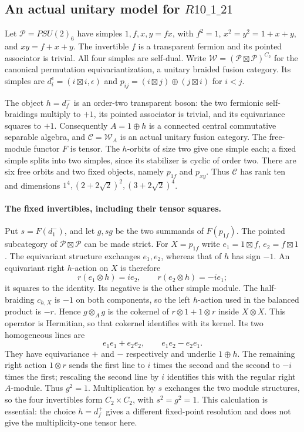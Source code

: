 \subsection[An actual unitary model for R10-1-21]{An actual unitary model for $R10\_1\_21$}
Let $\mathcal P=PSU(2)_6$ have simples $1,f,x,y=fx$, with
$f^2=1$, $x^2=y^2=1+x+y$, and $xy=f+x+y$.
The invertible $f$ is a transparent fermion and its pointed associator is
trivial. All four simples are self-dual. Write
$\mathcal W=(\mathcal P\boxtimes\mathcal P)^{C_2}$ for the canonical
permutation equivariantization, a unitary braided fusion category.
Its simples are $d_i^\epsilon=(i\boxtimes i,\epsilon)$ and
$p_{ij}=(i\boxtimes j)\oplus(j\boxtimes i)$ for $i<j$.

The object $h=d_f^-$ is an order-two transparent boson: the two fermionic
self-braidings multiply to $+1$, its pointed associator is trivial, and
its equivariance squares to $+1$. Consequently $A=1\oplus h$ is a
connected central commutative separable algebra, and $\mathcal C=\mathcal W_A$
is an actual unitary fusion category. The free-module functor $F$ is tensor.
The $h$-orbits of size two give one simple each; a fixed simple splits
into two simples, since its stabilizer is cyclic of order two. There are
six free orbits and two fixed objects, namely $p_{1f}$ and $p_{xy}$.
Thus $\mathcal C$ has rank ten and dimensions
$1^4,(2+2\sqrt2)^2,(3+2\sqrt2)^4$.

\paragraph{The fixed invertibles, including their tensor squares.}
Put $s=F(d_1^-)$, and let $g,sg$ be the two summands of $F(p_{1f})$.
The pointed subcategory of $\mathcal P\boxtimes\mathcal P$ can be made
strict. For $X=p_{1f}$ write $e_1=1\boxtimes f$, $e_2=f\boxtimes1$.
The equivariant structure exchanges $e_1,e_2$, whereas that of $h$ has
sign $-1$. An equivariant right $h$-action on $X$ is therefore
\[
 r(e_1\otimes h)=i e_2,\qquad r(e_2\otimes h)=-i e_1;
\]
it squares to the identity. Its negative is the other simple module.
The half-braiding $c_{h,X}$ is $-1$ on both components, so the left
$h$-action used in the balanced product is $-r$. Hence $g\otimes_Ag$
is the cokernel of $r\otimes1+1\otimes r$ inside $X\otimes X$.
This operator is Hermitian, so that cokernel identifies with its kernel.
Its two homogeneous lines are
\[
 e_1e_1+e_2e_2,\qquad e_1e_2-e_2e_1.
\]
They have equivariance $+$ and $-$ respectively and underlie $1\oplus h$.
The remaining right action $1\otimes r$ sends the first line to $i$ times
the second and the second to $-i$ times the first; rescaling the second
line by $i$ identifies this with the regular right $A$-module.
Thus $g^2=1$. Multiplication by $s$ exchanges the two module structures,
so the four invertibles form $C_2\times C_2$, with $s^2=g^2=1$.
This calculation is essential: the choice $h=d_f^+$ gives a different
fixed-point resolution and does not give the multiplicity-one tensor here.

